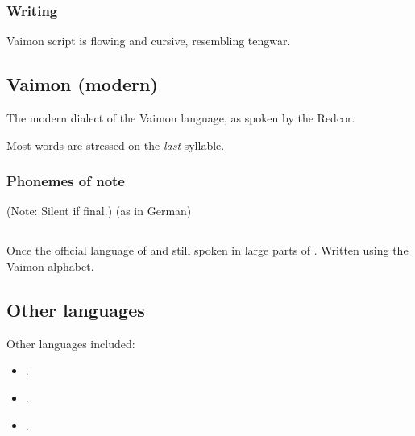 \subsubsection{Writing}
Vaimon script is flowing and cursive, resembling tengwar. 









\subsection{Vaimon (modern)}
The modern dialect of the Vaimon language, as spoken by the Redcor. 

Most words are stressed on the \emph{last} syllable. 





\begin{pronunciationenvironment}{\subsubsection{Phonemes of note}}
   (Note: Silent if final.)
   (as in German)
\end{pronunciationenvironment}














\subsection{\Velcadian}
Once the official language of  and still spoken in large parts of \Velcad. 
Written using the Vaimon alphabet. 
















\subsection{Other languages}
Other languages included:
\begin{itemize}
  \item {}.
  \item {}.
  \item {}.
\end{itemize}










